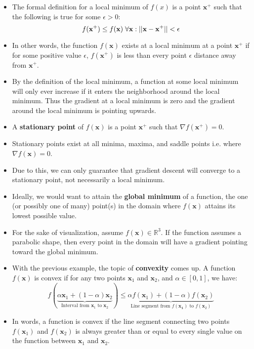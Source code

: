 \documentclass{article}
\newcommand{\tbf}[1]{\textbf{#1}}
\newcommand{\mbf}[1]{\mathbf{#1}}
\begin{document}
    \begin{itemize}
        \item The formal definition for a local minimum of $f(x)$ is a point $\mbf{x}^+$ such that the following is true for some $\epsilon > 0$:
        \[f(\mbf{x}^+) \leq f(\mbf{x}) \hspace{.1cm} \forall \mbf{x} : ||\mbf{x} - \mbf{x}^+|| < \epsilon\]
        \item In other words, the function $f(\mbf{x})$ exists at a local minimum at a point $\mbf{x}^+$ if for some positive value $\epsilon$, 
        $f(\mbf{x}^+)$ is less than every point $\epsilon$ distance away from $\mbf{x}^+$. 
        \item By the definition of the local minimum, a function at some local minimum will only ever increase if it enters the neighborhood around the local minimum. Thus the 
        gradient at a local minimum is zero and the gradient around the local minimum is pointing upwards. 
        \item A \tbf{stationary point} of $f(\mbf{x})$ is a point $\mbf{x}^+$ such that $\nabla f(\mbf{x}^+) = 0$.
        \item Stationary points exist at all minima, maxima, and saddle points i.e. where $\nabla f(\mbf{x}) = 0$.
        \item Due to this, we can only guarantee that gradient descent will converge to a stationary point, not necessarily a local minimum. 
        \item Ideally, we would want to attain the \tbf{global minimum} of a function, the one (or possibly one of many) point(s) in the domain where $f(\mbf{x})$ attains its lowest possible value.
        \item For the sake of visualization, assume  $f(\mbf{x}) \in \mathbb{R}^3$. If the function assumes a parabolic shape, then every point in the domain will have a gradient pointing toward the global minimum.
        \item With the previous example, the topic of \tbf{convexity} comes up. A function $f(\mbf{x})$ is convex if for any two points $\mbf{x}_1$ and $\mbf{x}_2$, and $\alpha \in [0,1]$, we have:
        \[f(\underbrace{\alpha \mbf{x}_1 + (1-\alpha)\mbf{x}_2}_{\text{Interval from $\mbf{x}_1$ to $\mbf{x}_2$}}) \leq \underbrace{\alpha f(\mbf{x}_1) + (1 - \alpha) f(\mbf{x}_2)}_{\text{Line segment from $f(\mbf{x_1})$ to $f(\mbf{x}_2)$}}\]
        \item In words, a function is convex if the line segment connecting two points $f(\mbf{x}_1)$ and $f(\mbf{x}_2)$ is always greater than or equal to every single value on the function between $\mbf{x}_1$ and $\mbf{x}_2$. 

\end{itemize}
\end{document}
